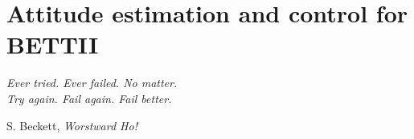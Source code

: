 
\chapter[Attitude estimation and control for BETTII]{Attitude estimation and control for BETTII} %

\label{chap:controls} %

\epigraph{\small\itshape Ever tried. Ever failed. No matter. \\ Try again. Fail again. Fail better.}{S. Beckett, \textit{Worstward Ho!}}


\usetikzlibrary{decorations.markings}

\renewcommand*{\arraystretch}{0.75}

%












